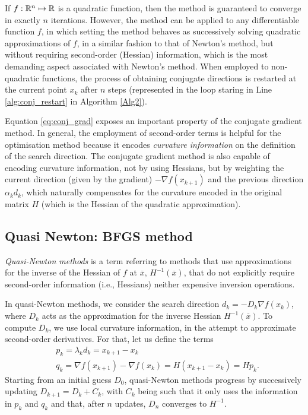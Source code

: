 If $f: \mathbb{R}^n \mapsto \mathbb{R}$ is a quadratic function, then the method is guaranteed to converge in exactly $n$ iterations. However, the method can be applied to any differentiable function $f$, in which setting the method behaves as successively solving quadratic approximations of $f$, in a similar fashion to that of Newton's method, but without requiring second-order (Hessian) information, which is the most demanding aspect associated with Newton's method. When employed to non-quadratic functions, the process of obtaining conjugate directions is restarted at the current point $x_k$ after $n$ steps (represented in the loop staring in Line \ref{alg:conj_restart} in Algorithm \ref{Alg2}).

Equation \eqref{eq:conj_grad} exposes an important property of the conjugate gradient method. In general, the employment of second-order terms is helpful for the optimisation method because it encodes \emph{curvature information} on the definition of the search direction. The conjugate gradient method is also capable of encoding curvature information, not by using Hessians, but by weighting the current direction (given by the gradient) $-\nabla f(x_{k+1})$ and the previous direction $\alpha_kd_k$, which naturally compensates for the curvature encoded in the original matrix $H$ (which is the Hessian of the quadratic approximation).


\subsection{Quasi Newton: BFGS method}


\emph{Quasi-Newton methods} is a term referring to methods that use approximations for the inverse of the Hessian of $f$ at $\overline{x}$, $H^{-1}(\overline{x})$, that do not explicitly require second-order information (i.e., Hessians) neither expensive inversion operations. 

In quasi-Newton methods, we consider the search direction $d_k = -D_k \nabla f(x_k)$, where $D_k$ acts as the approximation for the inverse Hessian $H^{-1}(\overline{x})$. To compute $D_k$, we use local curvature information, in the attempt to approximate second-order derivatives. For that, let us define the terms
%
\begin{align*}
&p_k = \lambda_k d_k = x_{k+1} - x_k\\
&q_k = \nabla f(x_{k+1}) - \nabla f(x_k) = H(x_{k+1} - x_k) = Hp_k.
\end{align*}
%
Starting from an initial guess $D_0$, quasi-Newton methods progress by successively updating $D_{k+1} = D_k + C_k$, with $C_k$ being such that it only uses the information in $p_k$ and $q_k$ and that, after $n$ updates, $D_n$ converges to $H^{-1}$.

